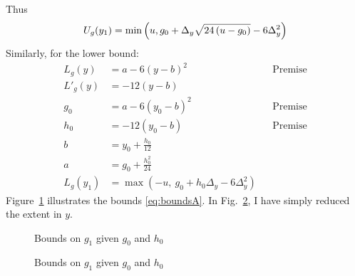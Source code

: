 \documentclass[twocolumn]{article}
\begin{document}
Thus
\begin{equation}
  \label{eq:ug}
  U_g(y_1) = \min \left( u,g_0 + \Delta_y\sqrt{24\left(u-g_0\right)} - 6 \Delta_y^2 \right)
\end{equation}
Similarly, for the lower bound:
\newcommand{\LgQ}{g_0 + h_0\Delta_y - 6\Delta_y^2}
\begin{align}
  L_g(y) &= a - 6(y-b)^2 &&\text{Premise} \nonumber \\
  L'_g(y) &= -12(y-b) \nonumber \\
  g_0 &= a - 6(y_0-b)^2 &&\text{Premise} \nonumber \\
  h_0 &= -12(y_0-b) &&\text{Premise} \nonumber \\
  b &= y_0 + \frac{h_0}{12} \nonumber \\
  a &= g_0 + \frac{h^2_0}{24} \\
  \label{eq:lg}
  L_g(y_1) &= \max \left( -u,~\LgQ \right)
\end{align}
Figure~\ref{fig:boundsA} illustrates the bounds
\eqref{eq:boundsA}.  In Fig.~\ref{fig:boundsB}, I have simply reduced
the extent in $y$.

\begin{figure}
  \centering
  \caption{Bounds on $g_1$ given $g_0$ and $h_0$}
  \label{fig:boundsA}
\end{figure}
\begin{figure}
  \centering
  \caption{Bounds on $g_1$ given $g_0$ and $h_0$}
  \label{fig:boundsB}
\end{figure}
\end{document}
